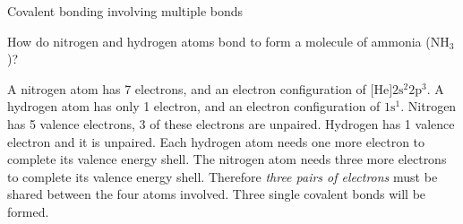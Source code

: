     \noindent
\par 
\begin{wex}{Covalent bonding involving multiple bonds }{
        \label{m38704*id139185}How do nitrogen and hydrogen atoms bond to form a molecule of ammonia ($\text{NH}{}_{3}$)? 
      
}
{
        \label{m38704*id139225}A nitrogen atom has 7 electrons, and an electron configuration of $\text{[He]}2\text{s}^{2}2\text{p}^{3}$. A hydrogen atom has only 1 electron, and an electron configuration of $1\text{s}^{1}$.
        \label{m38704*id139283}Nitrogen has 5 valence electrons, 3 of these electrons are unpaired. Hydrogen has 1 valence electron and it is unpaired. 
        \label{m38704*id139292}Each hydrogen atom needs one more electron to complete its valence energy shell. The nitrogen atom needs three more electrons to complete its valence energy shell. Therefore \textsl{three pairs of electrons} must be shared between the four atoms involved. Three single covalent bonds will be formed. 
    \setcounter{subfigure}{0}
\begin{figure}[H]
\end{figure}
 
}
\end{wex}

